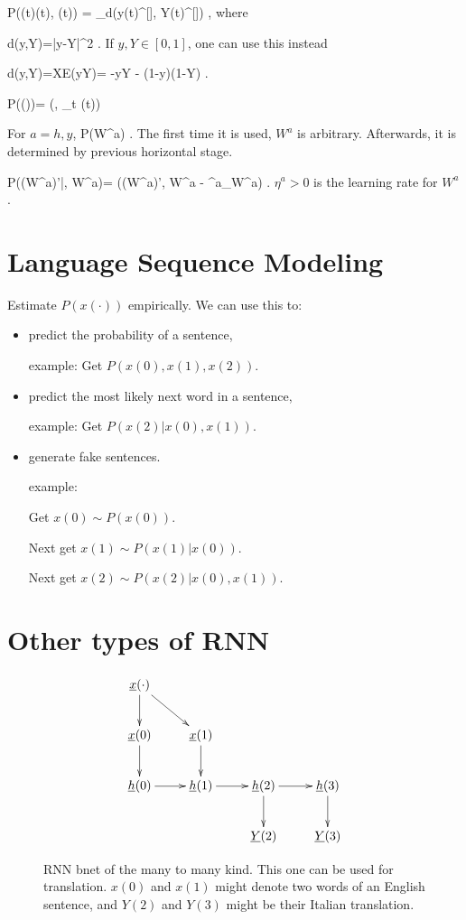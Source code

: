 \beq\color{blue}
P(\cale(t)\cond \vecy(t), (t))
=
\sum_\sigma d(y(t)^{[\s]}, Y(t)^{[\s]})
\;,
\eeq
where 

\beq
d(y,Y)=|y-Y|^2
\;.
\label{eq-d-err-sq}
\eeq
If $y, Y\in [0,1]$, 
one can use this instead

\beq
d(y,Y)=XE(y\rarrow Y)=
-y\ln Y - (1-y)\ln (1-Y)
\;.
\eeq

\beq\color{blue}
P(\cale\cond \cale(\cdot))=
\delta(\cale, \sum_t \cale(t))
\eeq

For $a=h,y$,
\beq\color{blue}
P(W^a)
\;.
\eeq
The first time it is used,
$W^a$ is arbitrary. Afterwards,
it is determined by previous 
horizontal
stage.

\beq\color{blue}
P((W^a)'|\cale, W^a)=
\delta((W^a)', W^a -
\eta ^a\partial_{W^a}\cale)
\;.
\eeq
$\eta ^a>0$ is the learning rate
for $W^a$.

\section{Language Sequence Modeling}

Estimate $P(x(\cdot))$ 
empirically.
We can use this to: 
\begin{itemize}
\item
predict the probability 
of a sentence,

example: Get $P(x(0), x(1), x(2))$.
\item
predict 
the most likely 
next word in a sentence,

example: Get $P(x(2)| x(0), x(1))$.
\item generate fake sentences.

example: 

Get $x(0)\sim P(x(0))$.

Next get $x(1)\sim P(x(1)|x(0))$.

Next get $x(2)\sim P(x(2)|x(0), x(1))$.


\end{itemize}

 
\section{Other types of RNN}

\begin{figure}[h!]
\centering
$$\xymatrix{
\rvx(\cdot)\ar[d]\ar[dr]\\
\rvx(0)\ar[d]&
\rvx(1)\ar[d]&
\\
\rvh(0)\ar[r]&
\rvh(1)\ar[r]&
\rvh(2)\ar[d]\ar[r]&
\rvh(3)\ar[d]\\
&
&
\rvY(2)&
\rvY(3)
}$$
\caption{RNN bnet of the
many to many kind. This
one can be used for  translation.
$x(0)$ and $x(1)$ might
denote two words of an English
sentence, and $Y(2)$ 
and $Y(3)$ might be
their Italian translation.}
\label{fig-rnn-translation}
\end{figure}

